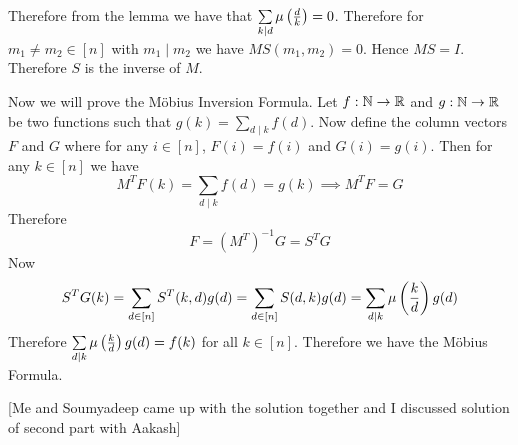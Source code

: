 \documentclass[a4paper, 11pt]{article}
\begin{document}
{\begin{itemize}[label=$\bullet$]
Therefore from the lemma we have that $\sum\limits_{\substack{ k\mid d}}\mu\left(\frac{d}{k}\right)=0$. Therefore for $m_1\neq m_2\in [n]$ with $m_1\mid m_2$ we have $MS(m_1,m_2)=0$. Hence $MS=I$. Therefore $S$ is the inverse of $M$.

Now we will prove the M\"{o}bius Inversion Formula. Let $f:\mathbb{N}\to \mathbb{R}$ and $g:\mathbb{N}\to\mathbb{R}$ be two functions  such that $g(k)=\sum\limits_{d\mid k}f(d)$. Now define the column vectors $F$ and $G$ where for any $i\in[n]$, $F(i)=f(i)$ and $G(i)=g(i)$. Then for any $k\in[n]$ we have $$M^TF(k)=\sum_{d\mid k}f(d)=g(k)\implies M^TF=G$$Therefore $$F=(M^T)^{-1}G=S^TG$$Now $$S^TG(k)=\sum_{d\in[n]}S^T(k,d)g(d)=\sum_{d\in[n]}S(d,k)g(d)=\sum_{d\mid k}\mu\left(\frac{k}d\right)g(d)$$Therefore $\sum\limits_{d\mid k}\mu\left(\frac{k}d\right)g(d)=f(k)$ for all $k\in[n]$. Therefore we have the M\"{o}bius Formula.
\end{itemize}
}\parinf

[Me and Soumyadeep came up with the solution together and I discussed solution of second part with Aakash]\parinn


\end{document}

